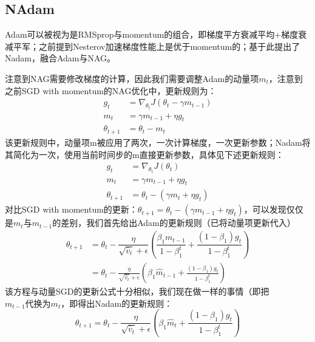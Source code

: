 \documentclass[10.5pt,a4paper]{article}%
\begin{document}
        \subsection{NAdam}
            Adam可以被视为是RMSprop与momentum的组合，即梯度平方衰减平均+梯度衰减平军；之前提到Nesterov加速梯度性能上是优于momentum的；基于此提出了Nadam\cite{nadam}，融合Adam与NAG。\par
            注意到NAG需要修改梯度的计算，因此我们需要调整Adam的动量项$m_t$，注意到之前SGD with momentum的NAG优化中，更新规则为：  
            \begin{align*}
                g_t&=\nabla_{\theta_t}J(\theta_t-\gamma m_{t-1})\\ m_t&=\gamma m_{t-1}+\eta g_t\\ \theta_{t+1}&=\theta_t-m_t
            \end{align*}
            该更新规则中，动量项m被应用了两次，一次计算梯度，一次更新参数；Nadam将其简化为一次，使用当前时间步的m直接更新参数，具体见下述更新规则：\begin{align*}g_t&=\nabla_{\theta_t}J(\theta_t)\\ m_t&=\gamma m_{t-1}+\eta g_t\\ \theta_{t+1}&=\theta_t-(\gamma m_t+\eta g_t)\end{align*}
            对比SGD with momentum的更新：$\theta_{t+1}=\theta_t-(\gamma m_{t-1}+\eta g_t)$，可以发现仅仅是$m_t \text{与}m_{t-1}$的差别，我们首先给出Adam的更新规则（已将动量项更新代入）
            \begin{align*}
            \theta_{t+1}&=\theta_t-\dfrac{\eta}{\sqrt{\hat{v}_t}+\epsilon}(\dfrac{\beta_1m_{t-1}}{1-\beta_1^t}+\dfrac{(1-\beta_1)g_t}{1-\beta_1^t})\\
            &=\theta_{t}-\frac{\eta}{\sqrt{\hat{v}_{t}}+\epsilon}(\beta_{1}\hat{m}_{t-1}+\frac{(1-\beta_{1})g_{t}}{1-\beta_{1}^{t}})
            \end{align*}
            该方程与动量SGD的更新公式十分相似，我们现在做一样的事情（即把$m_{t-1}\text{代换为}m_t$，即得出Nadam的更新规则：
            $$\theta_{t+1}=\theta_t-\dfrac{\eta}{\sqrt{\hat{v}_t}+\epsilon}(\beta_1\hat{m}_t+\dfrac{(1-\beta_1)g_t}{1-\beta_1^t})$$
\end{document}
